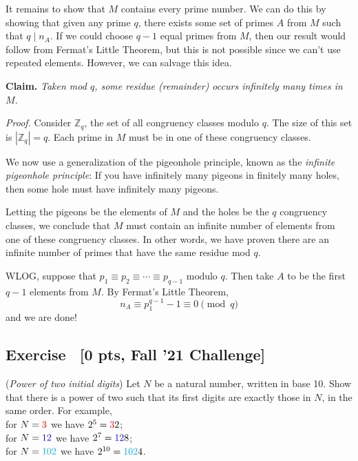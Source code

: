 \documentclass{article}
\newcounter{counter}
\newcommand{\Exercise}{Exercise \stepcounter{counter}\thecounter}
\begin{document}
    \vspace{2mm}
    \qquad It remains to show that $M$ contains every prime number. We can do this by showing that given any prime $q$, there exists some set of primes $A$ from $M$ such that $q \mid n_{A}$. If we could choose $q - 1$ equal primes from $M$, then our result would follow from Fermat's Little Theorem, but this is not possible since we can't use repeated elements. However, we can salvage this idea.
    
    \vspace{2mm}
    \textbf{Claim.} \textit{Taken mod $q$, some residue (remainder) occurs infinitely many times in $M$.}
    
    \vspace{2mm}
    \textit{Proof.} Consider $\mathbb{Z}_{q}$, the set of all congruency classes modulo $q$. The size of this set is $|\mathbb{Z}_{q}| = q$. Each prime in $M$ must be in one of these congruency classes.
    
    \vspace{2mm}
    We now use a generalization of the pigeonhole principle, known as the \textit{infinite pigeonhole principle}: If you have infinitely many pigeons in finitely many holes, then some hole must have infinitely many pigeons.
    
    \vspace{2mm}
    Letting the pigeons be the elements of $M$ and the holes be the $q$ congruency classes, we conclude that $M$ must contain an infinite number of elements from one of these congruency classes. In other words, we have proven there are an infinite number of primes that have the same residue mod $q$.
    
    \vspace{2mm}
    \qquad WLOG, suppose that $p_{1} \equiv p_{2} \equiv \cdots \equiv p_{q-1} \text{ modulo } q$. Then take $A$ to be the first $q - 1$ elements from $M$. By Fermat's Little Theorem, $$n_{A} \equiv p_{1}^{q-1} - 1 \equiv 0 \pmod{q}$$ and we are done!

\pagebreak

\subsection*{\Exercise \ [0 pts, Fall '21 Challenge]}
    (\textit{Power of two initial digits}) Let $N$ be a natural number, written in base 10. Show that there is a power of two such that its first digits are exactly those in $N$, in the same order. For example, \\
    for $N = \textcolor{red}{3}$ we have $2^{5} = \textcolor{red}{3}2$; \\
    for $N = \textcolor{blue}{12}$ we have $2^{7} = \textcolor{blue}{12}8$; \\
    for $N = \textcolor{cyan}{102}$ we have $2^{10} = \textcolor{cyan}{102}4$.
\end{document}
